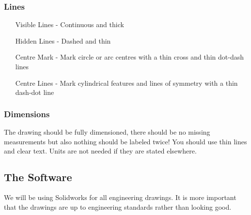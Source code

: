 \documentclass[12pt,a4paper]{article}
\begin{document}
		\subsubsection{Lines}
			\begin{itemize}
				\item[Visible Lines -] Continuous and thick
				\item[Hidden Lines -] Dashed and thin
				\item[Centre Mark -] Mark circle or arc centres with a thin cross and thin dot-dash lines
				\item[Centre Lines -] Mark cylindrical features and lines of symmetry with a thin dash-dot line
			\end{itemize}
			
		\subsubsection{Dimensions}
			The drawing should be fully dimensioned, there should be no missing measurements but also nothing should be labeled twice! You should use thin lines and clear text. Units are not needed if they are stated elsewhere.
	
	\subsection{The Software}
		We will be using Solidworks for all engineering drawings. It is more important that the drawings are up to engineering standards rather than looking good.
	
	
\end{document}
